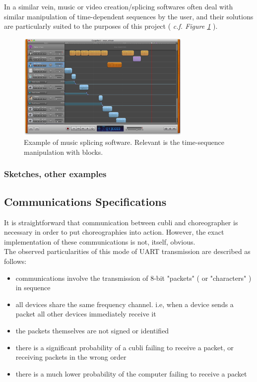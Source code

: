 In a similar vein, music or video creation/splicing softwares often deal with similar manipulation of time-dependent sequences by the user, and their solutions are particularly suited to the purposes of this project ( \textit{c.f. Figure \ref{img:MusicEditor}} ).\\

\begin{figure}[ht]
   \centering
   \includegraphics[width=0.75\textwidth]{img/MusicEditor.png}
   \caption{Example of music splicing software. Relevant is the time-sequence manipulation with blocks.}
   \label{img:MusicEditor}
\end{figure}


\subsubsection{Sketches, other examples}



\subsection{Communications Specifications}

It is straightforward that communication between cubli and choreographer is necessary in order to put choreographies into action. However, the exact implementation of these communications is not, itself, obvious.\\

The observed particularities of this mode of UART transmission are described as follows:
\begin{itemize}
\item communications involve the transmission of 8-bit "packets" ( or "characters" ) in sequence
\item all devices share the same frequency channel. i.e, when a device sends a packet all other devices immediately receive it
\item the packets themselves are not signed or identified
\item there is a significant probability of a cubli failing to receive a packet, or receiving packets in the wrong order
\item there is a much lower probability of the computer failing to receive a packet
\end{itemize}

